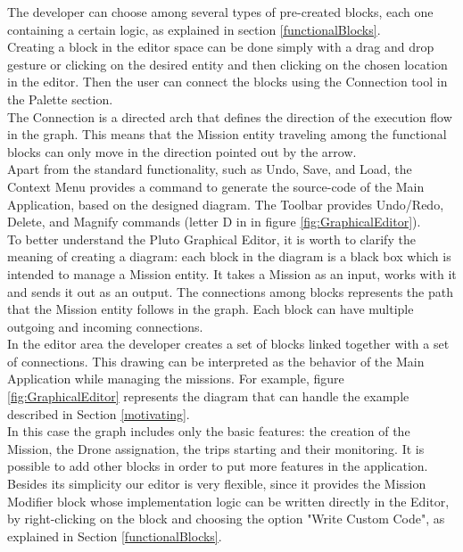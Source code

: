 The developer can choose among several types of pre-created blocks, each one containing a certain logic, as explained in section \ref{functionalBlocks}. 
\\
Creating a block in the editor space can be done simply with a drag and drop gesture or clicking on the desired entity and then clicking on the chosen location in the editor. Then the user can connect the blocks using the Connection tool in the Palette section.
\\
The Connection is a directed arch that defines the direction of the execution flow in the graph. This means that the Mission entity traveling among the functional blocks can only move in the direction pointed out by the arrow.
\\
 
Apart from the standard functionality, such as Undo, Save, and Load, the Context Menu provides a command to generate the source-code of the Main Application, based on the designed diagram. The Toolbar provides Undo/Redo, Delete, and Magnify commands (letter D in in figure \ref{fig:GraphicalEditor}).
\\

To better understand the Pluto Graphical Editor, it is worth to clarify the meaning of creating a diagram:
each block in the diagram is a black box which is intended to manage a Mission entity. 
It takes a Mission as an input, works with it and sends it out as an output.
The connections among blocks represents the path that the Mission entity follows in the graph.
Each block can have multiple outgoing and incoming connections.
\\

In the editor area the developer creates a set of blocks linked together with a set of connections. This drawing can be interpreted as the behavior of the Main Application while managing the missions.
For example, figure \ref{fig:GraphicalEditor} represents the diagram that can handle the example described in Section \ref{motivating}.
\\
In this case the graph includes only the basic features: the creation of the Mission, the Drone assignation, the trips starting and their monitoring. 
It is possible to add other blocks in order to put more features in the application.
\\

Besides its simplicity our editor is very flexible, since it provides the Mission Modifier block whose implementation logic can be written directly in the Editor, by right-clicking on the block and choosing the option "Write Custom Code", as explained in Section \ref{functionalBlocks}.

